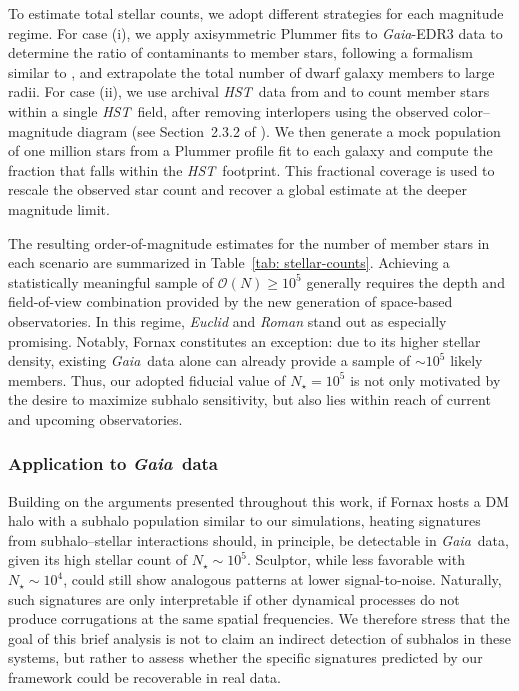 \documentclass[fleqn,usenatbib]{mnras}
\newcommand{\gaia}{{\sl Gaia}}
\newcommand{\hst}{{\sl HST}}
\begin{document}
To estimate total stellar counts, we adopt different strategies for each magnitude regime. For case (i), we apply axisymmetric Plummer fits to \gaia-EDR3 data to determine the ratio of contaminants to member stars, following a formalism similar to \citet{Vitral21}, and extrapolate the total number of dwarf galaxy members to large radii. For case (ii), we use archival \hst\ data from \citet{2021hst..prop16737S} and \citet{Vitral+23-UMi} to count member stars within a single \hst\ field, after removing interlopers using the observed color–magnitude diagram (see Section~2.3.2 of \citealt{Vitral+24}). We then generate a mock population of one million stars from a Plummer profile fit to each galaxy and compute the fraction that falls within the \hst\ footprint. This fractional coverage is used to rescale the observed star count and recover a global estimate at the deeper magnitude limit.

The resulting order-of-magnitude estimates for the number of member stars in each scenario are summarized in Table~\ref{tab: stellar-counts}. Achieving a statistically meaningful sample of $\mathcal{O}(N) \geq 10^{5}$ generally requires the depth and field-of-view combination provided by the new generation of space-based observatories. In this regime, {\it Euclid} and {\it Roman} stand out as especially promising. Notably, Fornax constitutes an exception: due to its higher stellar density, existing \gaia\ data alone can already provide a sample of $\sim 10^5$ likely members. Thus, our adopted fiducial value of $N_{\star} = 10^{5}$ is not only motivated by the desire to maximize subhalo sensitivity, but also lies within reach of current and upcoming observatories.

\subsubsection{Application to \gaia\ data} \label{sssec: test-gaia}

Building on the arguments presented throughout this work, if Fornax hosts a DM halo with a subhalo population similar to our simulations, heating signatures from subhalo–stellar interactions should, in principle, be detectable in \gaia\ data, given its high stellar count of $N_{\star} \sim 10^{5}$. Sculptor, while less favorable with $N_{\star} \sim 10^{4}$, could still show analogous patterns at lower signal-to-noise. Naturally, such signatures are only interpretable if other dynamical processes do not produce corrugations at the same spatial frequencies. We therefore stress that the goal of this brief analysis is not to claim an indirect detection of subhalos in these systems, but rather to assess whether the specific signatures predicted by our framework could be recoverable in real data.
\end{document}
